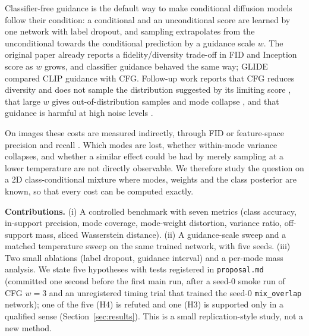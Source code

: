 Classifier-free guidance \cite{ho2022classifier} is the default way to make conditional diffusion models follow their condition: a conditional and an unconditional score are learned by one network with label dropout, and sampling extrapolates from the unconditional towards the conditional prediction by a guidance scale $w$. The original paper already reports a fidelity/diversity trade-off in FID and Inception score as $w$ grows, and classifier guidance \cite{dhariwal2021diffusion} behaved the same way; GLIDE \cite{nichol2021glide} compared CLIP guidance with CFG. Follow-up work reports that CFG reduces diversity and does not sample the distribution suggested by its limiting score \cite{moufad2025conditional}, that large $w$ gives out-of-distribution samples and mode collapse \cite{patel2023bridging}, and that guidance is harmful at high noise levels \cite{kynknniemi2024applying}.

On images these costs are measured indirectly, through FID or feature-space precision and recall \cite{kynknniemi2019improved,sajjadi2018assessing}. Which modes are lost, whether within-mode variance collapses, and whether a similar effect could be had by merely sampling at a lower temperature are not directly observable. We therefore study the question on a 2D class-conditional mixture where modes, weights and the class posterior are known, so that every cost can be computed exactly.

\textbf{Contributions.} (i) A controlled benchmark with seven metrics (class accuracy, in-support precision, mode coverage, mode-weight distortion, variance ratio, off-support mass, sliced Wasserstein distance). (ii) A guidance-scale sweep and a matched temperature sweep on the same trained network, with five seeds. (iii) Two small ablations (label dropout, guidance interval) and a per-mode mass analysis. We state five hypotheses with tests registered in \texttt{proposal.md} (committed one second before the first main run, after a seed-0 smoke run of CFG $w=3$ and an unregistered timing trial that trained the seed-0 \texttt{mix\_overlap} network); one of the five (H4) is refuted and one (H3) is supported only in a qualified sense (Section~\ref{sec:results}). This is a small replication-style study, not a new method.
